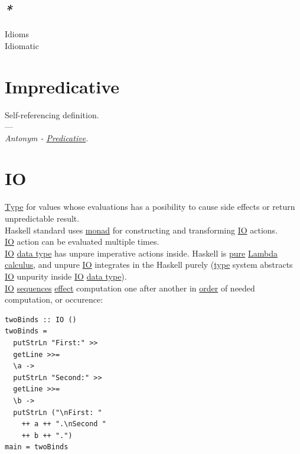 \documentclass[a4paper,14pt,oneside]{book}
\begin{document}
\section{\emph{*}}
\label{sec:org483c885}

\label{org795226a}Idioms\\
\label{org7d5cc88}Idiomatic\\

\chapter{\label{org02560f4}Impredicative}
\label{sec:orgaff7198}
Self-referencing definition.\\

---\\

\emph{Antonym - \hyperref[org2fea54f]{Predicative}.}\\

\chapter{\label{org3d3fd55}IO}
\label{sec:org893962e}
\hyperref[orgd6db20c]{Type} for values whose evaluations has a posibility to cause side effects or return unpredictable result.\\
Haskell standard uses \hyperref[org7054950]{monad} for constructing and transforming \hyperref[org3d3fd55]{IO} actions.\\
\hyperref[org3d3fd55]{IO} action can be evaluated multiple times.\\

\hyperref[org3d3fd55]{IO} \hyperref[orgbde1baf]{data type} has unpure imperative actions inside. Haskell is \hyperref[orgbb61cf1]{pure} \hyperref[org0f9cd10]{Lambda calculus}, and unpure \hyperref[org3d3fd55]{IO} integrates in the Haskell purely (\hyperref[orgd6db20c]{type} system abstracts \hyperref[org3d3fd55]{IO} unpurity inside \hyperref[org3d3fd55]{IO} \hyperref[orgbde1baf]{data type}).\\

\hyperref[org3d3fd55]{IO} \hyperref[org70bc57b]{sequences} \hyperref[org92840b4]{effect} computation one after another in \hyperref[org31793bd]{order} of needed computation, or occurence:\\

\begin{verbatim}
twoBinds :: IO ()
twoBinds =
  putStrLn "First:" >>
  getLine >>=
  \a ->
  putStrLn "Second:" >>
  getLine >>=
  \b ->
  putStrLn ("\nFirst: "
    ++ a ++ ".\nSecond "
    ++ b ++ ".")
main = twoBinds
\end{verbatim}
\end{document}
